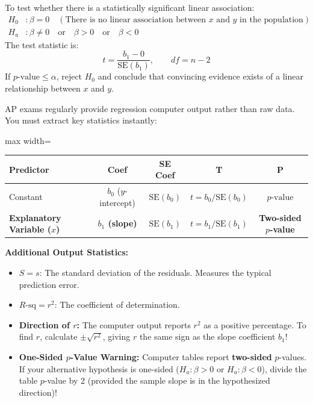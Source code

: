 \begin{lessonbox}[Lesson 9.3: Hypothesis Test for Slope $\beta$ ($H_0: \beta = 0$)]
To test whether there is a statistically significant linear association:
\begin{align*}
  H_0 &: \beta = 0 \quad (\text{There is no linear association between } x \text{ and } y \text{ in the population}) \\
  H_a &: \beta \neq 0 \quad \text{or} \quad \beta > 0 \quad \text{or} \quad \beta < 0
\end{align*}
The test statistic is:
\begin{equation}
  t = \frac{b_1 - 0}{\text{SE}(b_1)}, \qquad df = n - 2
\end{equation}
If $p\text{-value} \le \alpha$, reject $H_0$ and conclude that convincing evidence exists of a linear relationship between $x$ and $y$.
\end{lessonbox}

\begin{lessonbox}
AP exams regularly provide regression computer output rather than raw data. You must extract key statistics instantly:
\begin{center}
\begin{adjustbox}{max width=\linewidth}
\begin{tabular}{lcccc}
\toprule
\textbf{Predictor} & \textbf{Coef} & \textbf{SE Coef} & \textbf{T} & \textbf{P} \\
\midrule
Constant & $b_0$ ($y$-intercept) & $\text{SE}(b_0)$ & $t = b_0 / \text{SE}(b_0)$ & $p\text{-value}$ \\
\textbf{Explanatory Variable ($x$)} & \textbf{$b_1$ (slope)} & \textbf{$\text{SE}(b_1)$} & \textbf{$t = b_1 / \text{SE}(b_1)$} & \textbf{Two-sided $p$-value} \\
\bottomrule
\end{tabular}
\end{adjustbox}
\end{center}
\textbf{Additional Output Statistics:}
\begin{itemize}
  \item $S = s$: The standard deviation of the residuals. Measures the typical prediction error.
  \item $R\text{-sq} = r^2$: The coefficient of determination.
  \item \textbf{Direction of $r$:} The computer output reports $r^2$ as a positive percentage. To find $r$, calculate $\pm \sqrt{r^2}$, giving $r$ the same sign as the slope coefficient $b_1$!
  \item \textbf{One-Sided $p$-Value Warning:} Computer tables report \textbf{two-sided} $p$-values. If your alternative hypothesis is one-sided ($H_a: \beta > 0$ or $H_a: \beta < 0$), divide the table $p$-value by 2 (provided the sample slope is in the hypothesized direction)!
\end{itemize}
\end{lessonbox}

